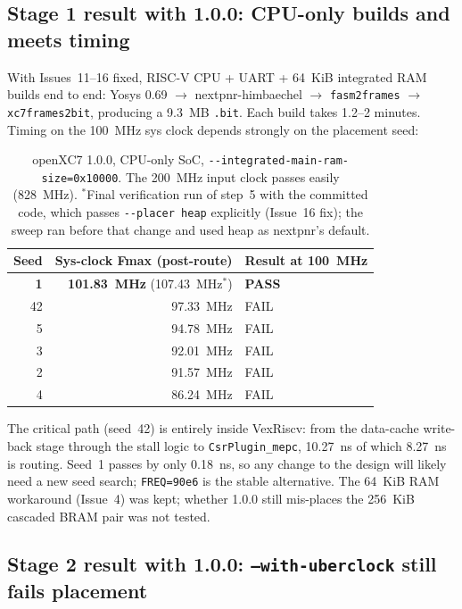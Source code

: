 \documentclass[11pt]{article}
\begin{document}
\subsection{Stage 1 result with 1.0.0: CPU-only builds and meets timing}
\label{sec:v100-stage1}

With Issues~11--16 fixed, RISC-V CPU + UART + 64~KiB integrated RAM builds
end to end: Yosys 0.69 $\to$ nextpnr-himbaechel $\to$
\lstinline{fasm2frames} $\to$ \lstinline{xc7frames2bit}, producing a
9.3~MB \lstinline{.bit}. Each build takes 1.2--2 minutes. Timing on the
100~MHz sys clock depends strongly on the placement seed:

\begin{table}[H]
\centering
\begin{tabular}{rrl}
\toprule
Seed & Sys-clock Fmax (post-route) & Result at 100~MHz \\
\midrule
\textbf{1} & \textbf{101.83~MHz} (107.43~MHz$^{*}$) & \textbf{PASS} \\
42 & 97.33~MHz & FAIL \\
5 & 94.78~MHz & FAIL \\
3 & 92.01~MHz & FAIL \\
2 & 91.57~MHz & FAIL \\
4 & 86.24~MHz & FAIL \\
\bottomrule
\end{tabular}
\caption{openXC7 1.0.0, CPU-only SoC, \lstinline{--integrated-main-ram-size=0x10000}.
The 200~MHz input clock passes easily (828~MHz).
$^{*}$Final verification run of step~5 with the committed code, which
passes \lstinline{--placer heap} explicitly (Issue~16 fix); the sweep ran
before that change and used heap as nextpnr's default.}
\end{table}

The critical path (seed~42) is entirely inside VexRiscv: from the
data-cache write-back stage through the stall logic to
\lstinline{CsrPlugin_mepc}, 10.27~ns of which 8.27~ns is routing. Seed~1
passes by only 0.18~ns, so any change to the design will likely need a new
seed search; \lstinline{FREQ=90e6} is the stable alternative. The 64~KiB RAM
workaround (Issue~4) was kept; whether 1.0.0 still mis-places the 256~KiB
cascaded BRAM pair was not tested.

\subsection{Stage 2 result with 1.0.0: \texttt{--with-uberclock} still
fails placement}
\label{sec:v100-stage2}
\end{document}
